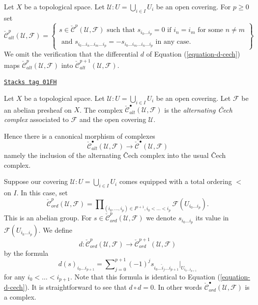 \medskip\noindent
Let $X$ be a topological space. Let $\mathcal{U} : U = \bigcup_{i \in I} U_i$
be an open covering. For $p \geq 0$ set
$$
\check{\mathcal{C}}_{alt}^p(\mathcal{U}, \mathcal{F})
=
\left\{
\begin{matrix}
s \in  \check{\mathcal{C}}^p(\mathcal{U}, \mathcal{F})
\text{ such that }
s_{i_0 \ldots i_p} = 0 \text{ if } i_n = i_m \text{ for some } n \not = m\\
\text{ and }
s_{i_0\ldots i_n \ldots i_m \ldots i_p}
=
-s_{i_0\ldots i_m \ldots i_n \ldots i_p}
\text{ in any case.}
\end{matrix}
\right\}
$$
We omit the verification that the differential $d$ of
Equation (\ref{equation-d-cech}) maps
$\check{\mathcal{C}}^p_{alt}(\mathcal{U}, \mathcal{F})$ into
$\check{\mathcal{C}}^{p + 1}_{alt}(\mathcal{U}, \mathcal{F})$.

\begin{definition}
\label{cohomology-definition-alternating-cech-complex}
\href{https://stacks.math.columbia.edu/tag/01FH}{\texttt{Stacks tag 01FH}}

Let $X$ be a topological space. Let $\mathcal{U} : U = \bigcup_{i \in I} U_i$
be an open covering. Let $\mathcal{F}$ be an abelian presheaf on $X$.
The complex $\check{\mathcal{C}}_{alt}^\bullet(\mathcal{U}, \mathcal{F})$
is the {\it alternating {\v C}ech complex} associated to $\mathcal{F}$ and the
open covering $\mathcal{U}$.
\end{definition}

Hence there is a canonical morphism of complexes
$$
\check{\mathcal{C}}_{alt}^\bullet(\mathcal{U}, \mathcal{F})
\longrightarrow
\check{\mathcal{C}}^\bullet(\mathcal{U}, \mathcal{F})
$$
namely the inclusion of the alternating {\v C}ech complex into the
usual {\v C}ech complex.

\medskip\noindent
Suppose our covering $\mathcal{U} : U = \bigcup_{i \in I} U_i$ comes
equipped with a total ordering $<$ on $I$. In this case, set
$$
\check{\mathcal{C}}_{ord}^p(\mathcal{U}, \mathcal{F})
=
\prod\nolimits_{(i_0, \ldots, i_p) \in I^{p + 1}, i_0 < \ldots < i_p}
\mathcal{F}(U_{i_0\ldots i_p}).
$$
This is an abelian group. For
$s \in \check{\mathcal{C}}_{ord}^p(\mathcal{U}, \mathcal{F})$ we denote
$s_{i_0\ldots i_p}$ its value in $\mathcal{F}(U_{i_0\ldots i_p})$.
We define
$$
d : \check{\mathcal{C}}_{ord}^p(\mathcal{U}, \mathcal{F})
\longrightarrow
\check{\mathcal{C}}_{ord}^{p + 1}(\mathcal{U}, \mathcal{F})
$$
by the formula
$$
d(s)_{i_0\ldots i_{p + 1}}
=
\sum\nolimits_{j = 0}^{p + 1}
(-1)^j
s_{i_0\ldots \hat i_j \ldots i_{p + 1}}|_{U_{i_0\ldots i_{p + 1}}}
$$
for any $i_0 < \ldots < i_{p + 1}$. Note that this formula is identical
to Equation (\ref{equation-d-cech}).
It is straightforward to see that $d \circ d = 0$. In other words
$\check{\mathcal{C}}_{ord}^\bullet(\mathcal{U}, \mathcal{F})$ is a complex.

